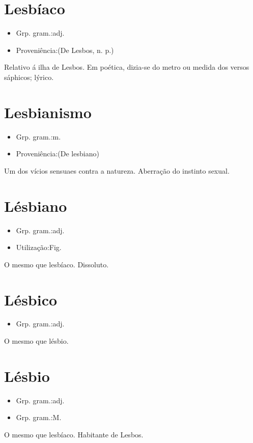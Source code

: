 \section{Lesbíaco}
\begin{itemize}
\item {Grp. gram.:adj.}
\end{itemize}
\begin{itemize}
\item {Proveniência:(De \textunderscore Lesbos\textunderscore , n. p.)}
\end{itemize}
Relativo á ilha de Lesbos.
Em poética, dizia-se do metro ou medida dos versos sáphicos; lýrico.
\section{Lesbianismo}
\begin{itemize}
\item {Grp. gram.:m.}
\end{itemize}
\begin{itemize}
\item {Proveniência:(De \textunderscore lesbiano\textunderscore )}
\end{itemize}
Um dos vícios sensuaes contra a natureza.
Aberração do instinto sexual.
\section{Lésbiano}
\begin{itemize}
\item {Grp. gram.:adj.}
\end{itemize}
\begin{itemize}
\item {Utilização:Fig.}
\end{itemize}
O mesmo que \textunderscore lesbíaco\textunderscore .
Dissoluto.
\section{Lésbico}
\begin{itemize}
\item {Grp. gram.:adj.}
\end{itemize}
O mesmo que \textunderscore lésbio\textunderscore .
\section{Lésbio}
\begin{itemize}
\item {Grp. gram.:adj.}
\end{itemize}
\begin{itemize}
\item {Grp. gram.:M.}
\end{itemize}
O mesmo que \textunderscore lesbíaco\textunderscore .
Habitante de Lesbos.
